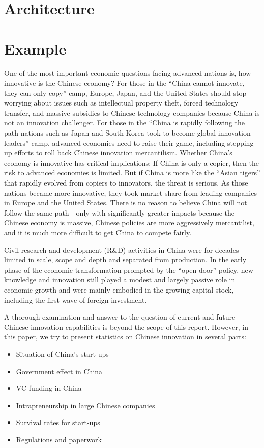 \documentclass[10pt]{article}
\begin{document}
\section{Architecture}
\section{Example}

One of the most important economic questions facing advanced nations is, how innovative is the Chinese economy? For those in the “China cannot innovate, they can only copy” camp, Europe, Japan, and the United States should stop worrying about issues such as intellectual property theft, forced technology transfer, and massive subsidies to Chinese technology companies because China is not an innovation challenger. For those in the “China is rapidly following the path nations such as Japan and South Korea took to become global innovation leaders” camp, advanced economies need to raise their game, including stepping up efforts to roll back Chinese innovation mercantilism. Whether China’s economy is innovative has critical implications: If China is only a copier, then the risk to advanced economies is limited. But if China is more like the “Asian tigers” that rapidly evolved from copiers to innovators, the threat is serious. As those nations became more innovative, they took market share from leading companies in Europe and the United States. There is no reason to believe China will not follow the same path—only with significantly greater impacts because the Chinese economy is massive, Chinese policies are more aggressively mercantilist, and it is much more difficult to get China to compete fairly.

Civil research and development (R\&D) activities in China were for decades limited in scale, scope and depth and separated from production. In the early phase of the economic transformation prompted by the “open door” policy, new knowledge and innovation still played a modest and largely passive role in economic growth and were mainly embodied in the growing capital stock, including the first wave of foreign investment.

A thorough examination and answer to the question of current and future Chinese innovation capabilities is beyond the scope of this report. However, in this paper, we try to present statistics on Chinese innovation in several parts:

\begin{itemize}
  \item Situation of China's start-ups
  \item Government effect in China
  \item VC funding in China
  \item Intrapreneurship in large Chinese companies
  \item Survival rates for start-ups
  \item Regulations and paperwork
\end{itemize}
\end{document}
